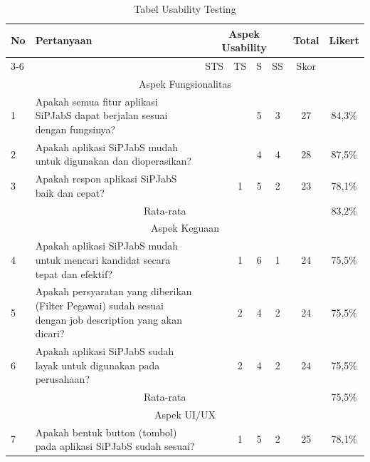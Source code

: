 \begin{table}
	\caption{Tabel Usability Testing}
	\centering
	\begin{tabular}{ | p{5mm} | p{62mm} | c | c | c | c | c | c |}
		\hline	
		
		\multirow{2}{*}{No} & \multirow{2}{*}{Pertanyaan} & \multicolumn{4}{|c|}{Aspek Usability} &  \multirow{2}{*}{Total} & \multirow{2}{*}{Likert} \\
		
		 \cline{3-6} & & STS & TS & S & SS & Skor & \\
		 \hline
		 
		 \multicolumn{8}{|c|}{Aspek Fungsionalitas} \\
		 \hline
		 
		 1 & Apakah semua fitur aplikasi SiPJabS dapat berjalan sesuai dengan fungsinya? &  &  &5 & 3 & 27 & 84,3\% \\
		 \hline
		 
		  2 & Apakah aplikasi SiPJabS mudah untuk digunakan dan dioperasikan? &  &  &4 & 4 & 28 & 87,5\% \\
		 \hline
		 
		 3 & Apakah respon aplikasi SiPJabS baik dan cepat? &  & 1  & 5 & 2 & 23 & 78,1\% \\
		 \hline
		 
		 \multicolumn{7}{|c|}{Rata-rata} & 83,2\% \\ 
		 \hline
		 
		 \multicolumn{8}{|c|}{Aspek Keguaan} \\
		 \hline
		 
		 4 & Apakah aplikasi SiPJabS mudah untuk mencari kandidat secara tepat dan efektif? &  & 1 &6 & 1 & 24 & 75,5\% \\
		 \hline
		 
		 5 & Apakah persyaratan yang diberikan (Filter Pegawai) sudah sesuai dengan job description yang akan dicari? &  & 2 &4 & 2 & 24 & 75,5\% \\
		 \hline
		 
		 6 & Apakah aplikasi SiPJabS sudah layak untuk digunakan pada perusahaan? &  & 2 &4 & 2 & 24 & 75,5\% \\
		 \hline
		 
		  \multicolumn{7}{|c|}{Rata-rata} & 75,5\% \\ 
		 \hline
		 
		 \multicolumn{8}{|c|}{Aspek UI/UX} \\
		 \hline
		 
		 7 & Apakah bentuk button (tombol) pada aplikasi SiPJabS sudah sesuai? &  & 1 &5 & 2 & 25 & 78,1\% \\
		 \hline
		 

\end{tabular}
\end{table}

